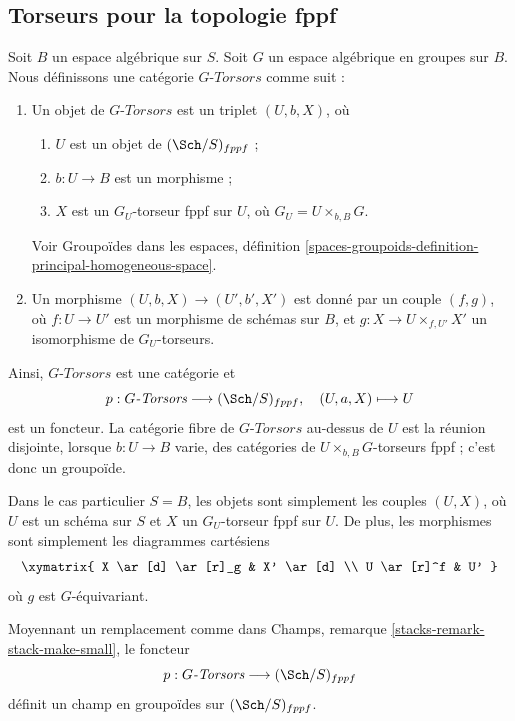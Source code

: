 \subsection{Torseurs pour la topologie fppf}
\label{subsection-fppf-torsors}

\noindent
Soit $B$ un espace algébrique sur $S$.
Soit $G$ un espace algébrique en groupes sur $B$.
Nous définissons une catégorie $G\textit{-Torsors}$ comme suit :
\begin{enumerate}
\item Un objet de $G\textit{-Torsors}$ est un triplet $(U, b, X)$, où
\begin{enumerate}
\item $U$ est un objet de $(\Sch/S)_{fppf}$ ;
\item $b : U \to B$ est un morphisme ;
\item $X$ est un $G_U$-torseur fppf sur $U$, où $G_U = U \times_{b, B} G$.
\end{enumerate}
Voir
Groupoïdes dans les espaces,
définition \ref{spaces-groupoids-definition-principal-homogeneous-space}.
\item Un morphisme $(U, b, X) \to (U', b', X')$ est donné
par un couple $(f, g)$, où $f : U \to U'$ est un morphisme de schémas
sur $B$, et $g : X \to U \times_{f, U'} X'$ un
isomorphisme de $G_U$-torseurs.
\end{enumerate}
Ainsi, $G\textit{-Torsors}$ est une catégorie et
$$
p : G\textit{-Torsors} \longrightarrow (\Sch/S)_{fppf},
\quad
(U, a, X) \longmapsto U
$$
est un foncteur. La catégorie fibre de $G\textit{-Torsors}$
au-dessus de $U$ est la réunion disjointe, lorsque $b : U \to B$ varie,
des catégories de $U \times_{b, B} G$-torseurs fppf ;
c'est donc un groupoïde.

\medskip\noindent
Dans le cas particulier $S = B$, les objets sont simplement les couples
$(U, X)$, où $U$ est un schéma sur $S$ et $X$ un
$G_U$-torseur fppf sur $U$. De plus, les morphismes sont simplement les diagrammes
cartésiens
$$
\xymatrix{
X \ar[d] \ar[r]_g & X' \ar[d] \\
U \ar[r]^f & U'
}
$$
où $g$ est $G$-équivariant.

\begin{lemma}
\label{lemma-torsors-stack-in-groupoids}
Moyennant un remplacement comme dans
Champs, remarque \ref{stacks-remark-stack-make-small},
le foncteur
$$
p : G\textit{-Torsors} \longrightarrow (\Sch/S)_{fppf}
$$
définit un champ en groupoïdes sur $(\Sch/S)_{fppf}$.
\end{lemma}

